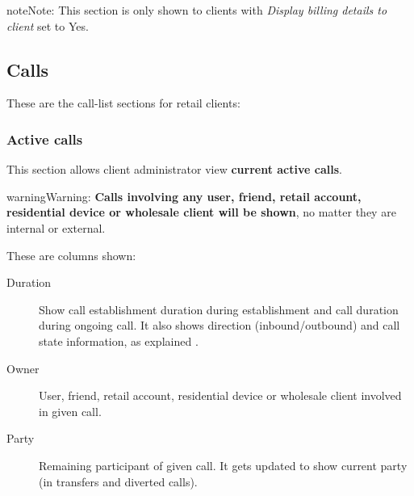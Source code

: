 \documentclass[letterpaper,10pt,english]{sphinxmanual}
\begin{document}
\begin{notice}{note}{Note:}
This section is only shown to clients with \emph{Display billing details to client} set to Yes.
\end{notice}


\subsection{Calls}
\label{administration_portal/client/retail/calls/index::doc}\label{administration_portal/client/retail/calls/index:calls}
These are the call-list sections for retail clients:


\subsubsection{Active calls}
\label{administration_portal/client/retail/calls/active_calls::doc}\label{administration_portal/client/retail/calls/active_calls:active-calls}
This section allows client administrator view \textbf{current active calls}.

\begin{notice}{warning}{Warning:}
\textbf{Calls involving any user, friend, retail account, residential device or wholesale client will be shown},
no matter they are internal or external.
\end{notice}

These are columns shown:
\begin{description}
\item[{Duration}] \leavevmode{}\label{administration_portal/client/retail/calls/active_calls:term-duration}
Show call establishment duration during establishment and call duration during ongoing call. It also shows
direction (inbound/outbound) and call state information, as explained {\hyperref[administration_portal/platform/active_calls:call\string-state]{}}.

\item[{Owner}] \leavevmode{}\label{administration_portal/client/retail/calls/active_calls:term-owner}
User, friend, retail account, residential device or wholesale client involved in given call.

\item[{Party}] \leavevmode{}\label{administration_portal/client/retail/calls/active_calls:term-party}
Remaining participant of given call. It gets updated to show current party (in transfers and diverted calls).

\end{description}
\end{document}
